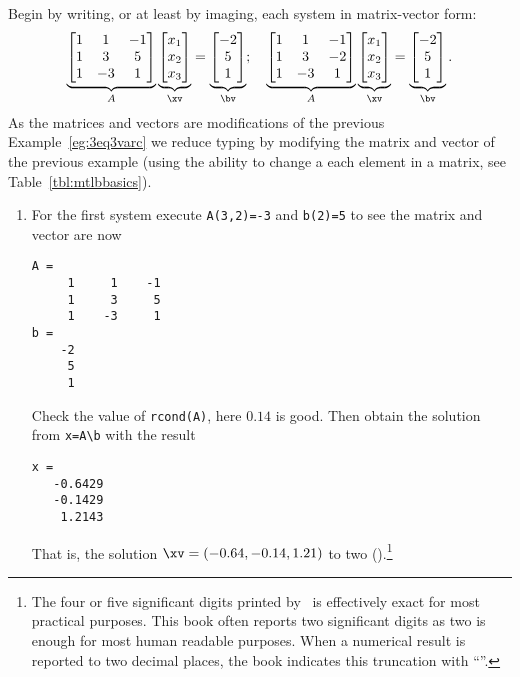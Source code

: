 \begin{example}
\begin{solution} 
Begin by writing, or at least by imaging, each system in matrix-vector form:
\begin{equation*}
\underbrace{\begin{bmatrix} 1&1&-1\\ 1&3&5\\1&-3&1 \end{bmatrix}}_A
\underbrace{\begin{bmatrix} x_1\\x_2\\x_3 \end{bmatrix}}_\xv
=\underbrace{\begin{bmatrix} -2\\5\\1 \end{bmatrix}}_\bv ;
\quad
\underbrace{\begin{bmatrix} 1&1&-1\\ 1&3&-2\\1&-3&1 \end{bmatrix}}_A
\underbrace{\begin{bmatrix} x_1\\x_2\\x_3 \end{bmatrix}}_\xv
=\underbrace{\begin{bmatrix} -2\\5\\1 \end{bmatrix}}_\bv .
\end{equation*}
As the matrices and vectors are modifications of the previous Example~\ref{eg:3eq3varc} we reduce typing by modifying the matrix and vector of the previous example (using the ability to change a each element in a matrix, see Table~\ref{tbl:mtlbbasics}).
\begin{enumerate}
\item For the first system execute \verb|A(3,2)=-3| and \verb|b(2)=5|
to see the matrix and vector are now
\begin{verbatim}
A =
     1     1    -1
     1     3     5
     1    -3     1
b =
    -2
     5
     1
\end{verbatim}
Check the value of \verb|rcond(A)|, here \(0.14\) is good.
Then obtain the solution from \verb|x=A\b| with the result
\begin{verbatim}
x =
   -0.6429
   -0.1429
    1.2143
\end{verbatim}
That is, the solution \(\xv=(-0.64,-0.14,1.21)\) to two  ().\footnote{The four or five significant digits printed by \script\ is effectively exact for most practical purposes.
This book often reports two significant digits as two is enough for most human readable purposes.
When a numerical result is reported to two decimal places, the book indicates this truncation with ``\twodp''.}


\end{enumerate}
\end{solution}
\end{example}
